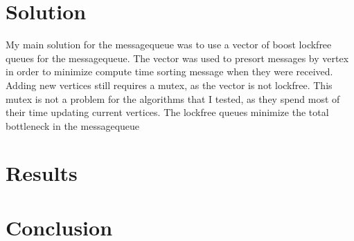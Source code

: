 \documentclass{sig-alternate-05-2015}
\begin{document}
\section{Solution}
My main solution for the messagequeue was to use a vector of boost lockfree queues for the messagequeue. The vector was used to presort messages by vertex in order to minimize compute time sorting message when they were received. Adding new vertices still requires a mutex, as the vector is not lockfree. This mutex is not a problem for the algorithms that I tested, as they spend most of their time updating current vertices. The lockfree queues minimize the total bottleneck in the messagequeue



\section{Results}

\section{Conclusion}


 

%
%
\appendix
\end{document}
